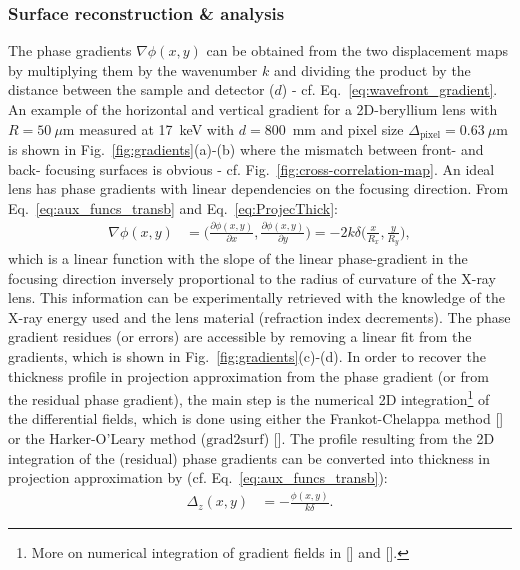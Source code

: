 \begin{refsection}
\subsubsection*{Surface reconstruction \& analysis}

The phase gradients $\nabla\phi(x,y)$ can be obtained from the two displacement maps by multiplying them by the wavenumber $k$ and dividing the product by the distance between the sample and detector ($d$) - cf. Eq.~\ref{eq:wavefront_gradient}. An example of the horizontal and vertical gradient for a 2D-beryllium lens with $R=50~\mu$m measured at 17~keV with $d=800$~mm and pixel size $\Delta_\text{pixel}= 0.63~\mu$m is shown in Fig.~\ref{fig:gradients}(a)-(b) where the mismatch between front- and back- focusing surfaces is obvious - cf. Fig.~\ref{fig:cross-correlation-map}. An ideal lens has phase gradients with linear dependencies on the focusing direction. From Eq.~\ref{eq:aux_funcs_transb} and Eq.~\ref{eq:ProjecThick}: 
\begin{align}
    \nabla\phi(x,y) & = \Bigg(\frac{\partial \phi(x,y)}{\partial x},\frac{\partial \phi(x,y)}{\partial y}  \Bigg) = -2k\delta\Bigg(\frac{x}{R_x},\frac{y}{R_y}\Bigg),
\end{align}{}
which is a linear function with the slope of the linear phase-gradient in the focusing direction inversely proportional to the radius of curvature of the X-ray lens. This information  can be experimentally retrieved with the knowledge of the X-ray energy used and the lens material (refraction index decrements). The phase gradient residues (or errors) are accessible by removing a linear fit from the gradients, which is shown in Fig.~\ref{fig:gradients}(c)-(d). In order to recover the thickness profile in projection approximation from the phase gradient (or from the residual phase gradient), the main step is the numerical 2D integration\footnote{More on numerical integration of gradient fields in [\cite{Huang2015}] and [\cite{Agrawal2006}].} of the differential fields, which is done using either the Frankot-Chelappa method [\cite{Frankot1988}] or the Harker-O'Leary method ($\text{grad2surf}$) [\cite{Harker2015}]. The profile resulting from the 2D integration of the (residual) phase gradients can be converted into thickness in projection approximation by (cf. Eq.~\ref{eq:aux_funcs_transb}):
\begin{align}\label{eq:recovered_thickness}
     \Delta_z(x,y)&=-\frac{\phi(x,y)}{k\delta}.
\end{align}{}

\end{refsection}
